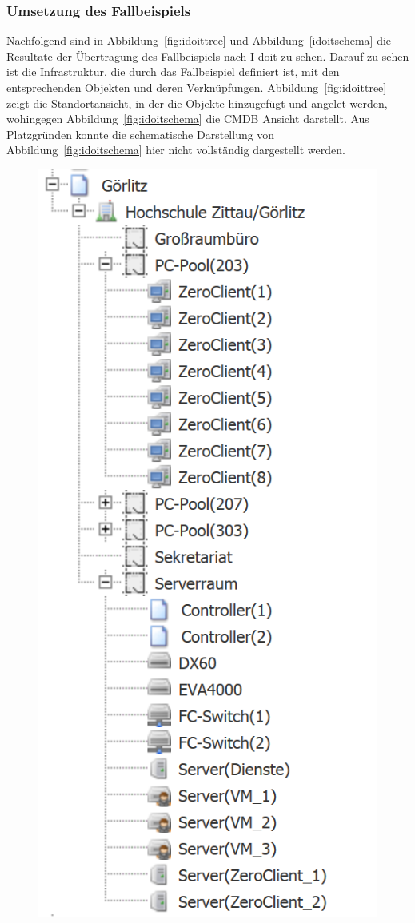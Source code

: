 \subsubsection{Umsetzung des Fallbeispiels}
Nachfolgend sind in Abbildung~\ref{fig:idoittree} und Abbildung~\ref{idoitschema} die Resultate der Übertragung des Fallbeispiels nach I-doit zu sehen.
Darauf zu sehen ist die Infrastruktur, die durch das Fallbeispiel definiert ist, mit den entsprechenden Objekten und deren Verknüpfungen.
Abbildung~\ref{fig:idoittree} zeigt die Standortansicht, in der die Objekte hinzugefügt und angelet werden, wohingegen Abbildung~\ref{fig:idoitschema} die CMDB Ansicht 
darstellt.
Aus Platzgründen konnte die schematische Darstellung von Abbildung~\ref{fig:idoitschema} hier nicht vollständig dargestellt werden.

\begin{figure}[htbp]
\includegraphics[scale=1]{images/idoittree}

\end{figure}
